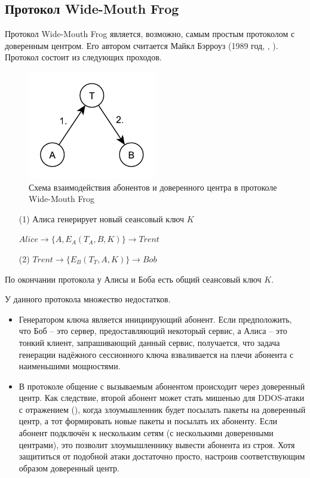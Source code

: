 \subsection{Протокол Wide-Mouth Frog}\label{section-protocols-wide-moth-frog}
Протокол Wide-Mouth Frog является, возможно, самым простым протоколом с доверенным центром. Его автором считается Майкл Бэрроуз (1989 год, , \cite{Burrows:Abadi:Needham:1990}). Протокол состоит из следующих проходов.

\begin{figure}
    \centering
    \includegraphics[width=0.5\textwidth]{pic/key_distribution-wide-mouth_frog}
    \caption{Схема взаимодействия абонентов и доверенного центра в протоколе Wide-Mouth Frog\label{fig:key_distribution-wide-mouth_frog}}
\end{figure}

\begin{enumerate}
	\item[(1)] Алиса генерирует новый сеансовый ключ $K$
    \item[{}] $Alice \to \{ A, E_A \left( T_A, B, K \right) \} \to Trent$
	\item[(2)] $Trent \to \{ E_B \left( T_T, A, K \right) \} \to Bob$
\end{enumerate}

По окончании протокола у Алисы и Боба есть общий сеансовый ключ $K$.

У данного протокола множество недостатков.

\begin{itemize}
	\item Генератором ключа является инициирующий абонент. Если предположить, что Боб -- это сервер, предоставляющий некоторый сервис, а Алиса -- это тонкий клиент, запрашивающий данный сервис, получается, что задача генерации надёжного сессионного ключа взваливается на плечи абонента с наименьшими мощностями.
	\item В протоколе общение с вызываемым абонентом происходит через доверенный центр. Как следствие, второй абонент может стать мишенью для DDOS-атаки с отражением (), когда злоумышленник будет посылать пакеты на доверенный центр, а тот формировать новые пакеты и посылать их абоненту. Если абонент подключён к нескольким сетям (с несколькими доверенными центрами), это позволит злоумышленнику вывести абонента из строя. Хотя защититься от подобной атаки достаточно просто, настроив соответствующим образом доверенный центр.
\end{itemize}

